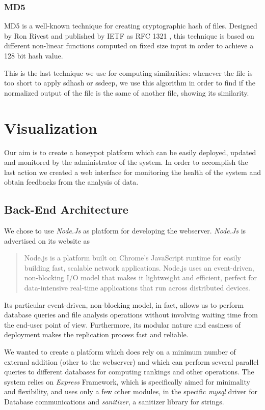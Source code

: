 \subsubsection{MD5}
MD5 is a well-known technique for creating cryptographic hash of files. Designed by Ron Rivest and published by IETF as RFC 1321 \cite{md5}, this technique is based on different non-linear functions computed on fixed size input in order to achieve a 128 bit hash value.

This is the last technique we use for computing similarities: whenever the file is too short to apply sdhash or ssdeep, we use this algorithm in order to find if the normalized output of the file is the same of another file, showing its similarity.

\section{Visualization}

Our aim is to create a honeypot platform which can be easily deployed, updated and monitored by the administrator of the system. In order to accomplish the last action we created a web interface for monitoring the health of the system and obtain feedbacks from the analysis of data.

\subsection{Back-End Architecture}

We chose to use \emph{Node.Js} as platform for developing the webserver. \emph{Node.Js} is advertised on its website \cite{node_home} as
\begin{quotation}
Node.js is a platform built on Chrome's JavaScript runtime for easily building fast, scalable network applications. Node.js uses an event-driven, non-blocking I/O model that makes it lightweight and efficient, perfect for data-intensive real-time applications that run across distributed devices.
\end{quotation}

Its particular event-driven, non-blocking model, in fact, allows us to perform database queries and file analysis operations without involving waiting time from the end-user point of view. Furthermore, its modular nature and easiness of deployment makes the replication process fast and reliable.

We wanted to create a platform which does rely on a minimum number of external addition (other to the webserver) and which can perform several parallel queries to different databases for computing rankings and other operations. The system relies on \emph{Express} \cite{express_node} Framework, which is specifically aimed for minimality and flexibility, and uses only a few other modules, in the specific \emph{mysql} driver for Database communications and \emph{sanitizer}, a sanitizer library for strings.

